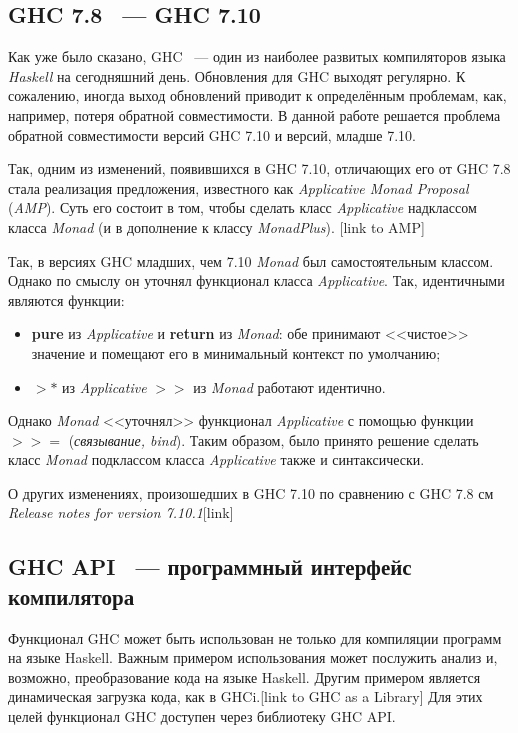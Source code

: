 \subsection{GHC 7.8 ~--- GHC 7.10}
Как уже было сказано, GHC ~--- один из наиболее развитых компиляторов языка \textit{Haskell} на сегодняшний день. Обновления для GHC выходят регулярно. К сожалению, иногда выход обновлений приводит к определённым проблемам, как, например, потеря обратной совместимости. В данной работе решается проблема обратной совместимости версий GHC 7.10 и версий, младше 7.10.

Так, одним из изменений, появившихся в GHC 7.10, отличающих его от GHC 7.8 стала реализация предложения, известного как \textit{Applicative Monad Proposal} (\textit{AMP}). Суть его состоит в том, чтобы сделать класс \textit{Applicative} надклассом класса \textit{Monad} (и в дополнение к классу \textit{MonadPlus}). [link to AMP] 

Так, в версиях GHC младших, чем 7.10 \textit{Monad} был самостоятельным классом. Однако по смыслу он уточнял функционал класса \textit{Applicative}. Так, идентичными являются функции:
\begin{itemize}
\item \textbf{pure} из \textit{Applicative} и \textbf{return} из \textit{Monad}: обе принимают <<чистое>> значение и помещают его в минимальный контекст по умолчанию;
\item \textbf{$>*$} из \textit{Applicative} \textbf{$>>$} из \textit{Monad} работают идентично.
\end{itemize}
Однако \textit{Monad} <<уточнял>> функционал \textit{Applicative} с помощью функции \textbf{$>>=$} (\textit{связывание, bind}). Таким образом, было принято решение сделать класс \textit{Monad} подклассом класса \textit{Applicative} также и синтаксически.

О других изменениях, произошедших в GHC 7.10 по сравнению с GHC 7.8 см \textit{Release notes for version 7.10.1}[link]


\subsection{GHC API ~--- программный интерфейс компилятора}
Функционал GHC может быть использован не только для компиляции программ на языке Haskell. Важным примером использования может послужить анализ и, возможно, преобразование кода на языке Haskell. Другим примером является динамическая загрузка кода, как в GHCi.[link to GHC as a Library] Для этих целей функционал GHC доступен через библиотеку GHC API.

